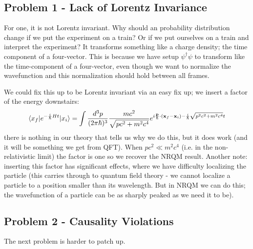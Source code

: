 \subsection{Problem 1 - Lack of Lorentz Invariance}
For one, it is not Lorentz invariant. Why should an probability distribution change if we put the experiment on a train? Or if we put ourselves on a train and interpret the experiment? It transforms something like a charge density; the time component of a four-vector. This is because we have setup $\psi^\dag\psi$ to transform like the time-component of a four-vector, even though we want to normalize the wavefunction and this normalization should hold between all frames.

We could fix this up to be Lorentz invariant via an easy fix up; we insert a factor of the energy downstairs:
\begin{equation}\label{eq-RQMtransitionprob}
    \langle x_f \rvert e^{-\frac{i}{\hbar}Ht}\lvert x_i \rangle = \int \frac{d^3p}{(2\pi\hbar)^3}\frac{mc^2}{\sqrt{pc^2 + m^2c^4}}e^{i\frac{\mathbf{p}}{\hbar}\cdot(\mathbf{x}_f - \mathbf{x}_i) -\frac{i}{\hbar}\sqrt{p^2c^2 + m^2c^4}t}
\end{equation}
there is nothing in our theory that tells us why we do this, but it does work (and it will be something we get from QFT). When $pc^2 \ll m^2c^4$ (i.e. in the non-relativistic limit) the factor is one so we recover the NRQM result. Another note: inserting this factor has significant effects, where we have difficulty localizing the particle (this carries through to quantum field theory - we cannot localize a particle to a position smaller than its wavelength. But in NRQM we can do this; the wavefunction of a particle can be as sharply peaked as we need it to be).

\subsection{Problem 2 - Causality Violations}
The next problem is harder to patch up.

